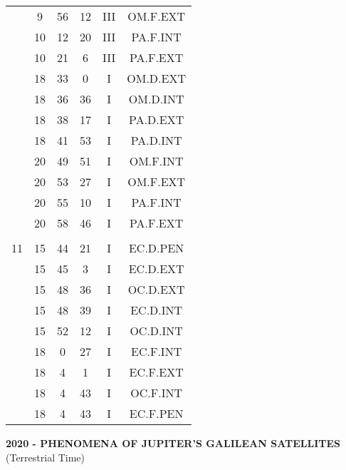 \documentclass[12pt, a4paper]{article}
\begin{document}
\begin{multicols}{3}
{\begin{tabular}{c c c c c c}
	 	 	 	 & 9 & 56 & 12 & III & OM.F.EXT\\%
	 	 	 	 & 10 & 12 & 20 & III & PA.F.INT\\%
	 	 	 	 & 10 & 21 & 6 & III & PA.F.EXT\\%
	 	 	 	 & 18 & 33 & 0 & I & OM.D.EXT\\%
	 	 	 	 & 18 & 36 & 36 & I & OM.D.INT\\%
	 	 	 	 & 18 & 38 & 17 & I & PA.D.EXT\\%
	 	 	 	 & 18 & 41 & 53 & I & PA.D.INT\\%
	 	 	 	 & 20 & 49 & 51 & I & OM.F.INT\\%
	 	 	 	 & 20 & 53 & 27 & I & OM.F.EXT\\%
	 	 	 	 & 20 & 55 & 10 & I & PA.F.INT\\%
	 	 	 	 & 20 & 58 & 46 & I & PA.F.EXT\\%
	 	 	 	 & & & & & \\%
	 	 	 	11 & 15 & 44 & 21 & I & EC.D.PEN\\%
	 	 	 	 & 15 & 45 & 3 & I & EC.D.EXT\\%
	 	 	 	 & 15 & 48 & 36 & I & OC.D.EXT\\%
	 	 	 	 & 15 & 48 & 39 & I & EC.D.INT\\%
	 	 	 	 & 15 & 52 & 12 & I & OC.D.INT\\%
	 	 	 	 & 18 & 0 & 27 & I & EC.F.INT\\%
	 	 	 	 & 18 & 4 & 1 & I & EC.F.EXT\\%
	 	 	 	 & 18 & 4 & 43 & I & OC.F.INT\\%
	 	 	 	 & 18 & 4 & 43 & I & EC.F.PEN\\%
	 	 \end{tabular}
 	}
\end{multicols}
\pagebreak
\textbf{2020 - PHENOMENA OF JUPITER'S GALILEAN SATELLITES}\\(Terrestrial Time) 
\end{document}
